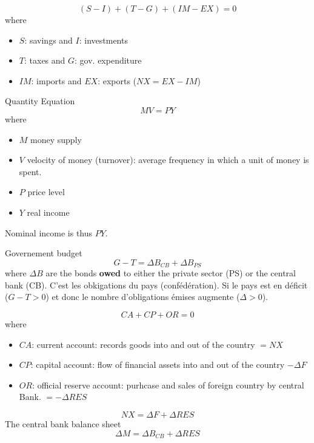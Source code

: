 \documentclass[a4paper] {scrartcl}
\begin{document}
\begin{equation}
	(S-I) + (T-G) + (IM-EX) = 0
\end{equation}
where
\begin{itemize}
	\item $S$: savings and $I$: investments
	\item $T$: taxes and $G$: gov. expenditure
	\item $IM$: imports and $EX$: exports ($NX=EX-IM$)
\end{itemize}
Quantity Equation
\begin{equation}
	MV = PY
\end{equation}
where
\begin{itemize}
	\item $M$ money supply
	\item $V$ velocity of money (turnover): average frequency in which a unit of money is spent.
	\item $P$ price level
	\item $Y$ real income
\end{itemize}

Nominal income is thus $PY$.

Governement budget
\begin{equation}
	G-T = \Delta B_{CB} + \Delta B_{PS}
\end{equation}
where $\Delta B$ are the bonds \textbf{owed} to either the private sector (PS) or the central bank (CB). C'est les obkigations du pays (confédération). Si le pays est en déficit ($G-T>0$) et donc le nombre d'obligations émises augmente ($\Delta>0$).



\begin{equation}
	CA + CP + OR =0
\end{equation}
where 
\begin{itemize}
	\item $CA$: current account: records goods into and out of the country $=NX$
	\item $CP$: capital account: flow of financial assets into and out of the country $-\Delta F$
	\item $OR$: official reserve account: purhcase and sales of foreign country by central Bank. $=-\Delta RES$
\end{itemize}
\begin{equation}
	NX = \Delta F + \Delta RES
\end{equation}
The central bank balance sheet
\begin{equation}
	\Delta M =\Delta B_{CB} + \Delta RES
\end{equation}
\end{document}
